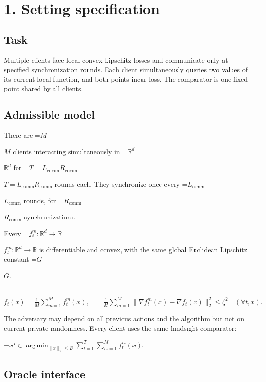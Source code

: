 \documentclass[10pt,a4paper]{article}
\newcommand{\AtlasMath}[1]{\par\begingroup\centering\setbox0=\hbox{$\displaystyle #1$}\ifdim\wd0>1.4\linewidth\typeout{ATLAS WIDE FORMULA: \the\wd0}\fi\ifdim\wd0>\linewidth\resizebox{\linewidth}{!}{\box0}\else\box0\fi\par\endgroup}
\newcommand{\AtlasInlineMath}[1]{\begingroup\setbox0=\hbox{$#1$}\ifdim\wd0>.4\linewidth\endgroup\AtlasMath{#1}\else\endgroup$#1$\fi}
\begin{document}
\section{1. Setting specification}


\subsection{Task}


Multiple clients face local convex Lipschitz losses and communicate only at specified synchronization rounds. Each client simultaneously queries two values of its current local function, and both points incur loss. The comparator is one fixed point shared by all clients.



\subsection{Admissible model}


There are \AtlasInlineMath{M} clients interacting simultaneously in \AtlasInlineMath{\mathbb{R}^d} for \AtlasInlineMath{T=L_{\mathrm{comm}}R_{\mathrm{comm}}} rounds each. They synchronize once every \AtlasInlineMath{L_{\mathrm{comm}}} rounds, for \AtlasInlineMath{R_{\mathrm{comm}}} synchronizations.



Every \AtlasInlineMath{f_t^m:\mathbb{R}^d\to\mathbb{R}} is differentiable and convex, with the same global Euclidean Lipschitz constant \AtlasInlineMath{G}.




\AtlasMath{f_t(x)=\frac1M\sum_{m=1}^{M}f_t^m(x),\qquad \frac1M\sum_{m=1}^{M}\|\nabla f_t^m(x)-\nabla f_t(x)\|_2^2\le\zeta^2\quad(\forall t,x).}




The adversary may depend on all previous actions and the algorithm but not on current private randomness. Every client uses the same hindsight comparator:




\AtlasMath{x^\star\in\operatorname*{arg\,min}_{\|x\|_2\le B}\sum_{t=1}^{T}\sum_{m=1}^{M}f_t^m(x).}




\subsection{Oracle interface}
\end{document}

